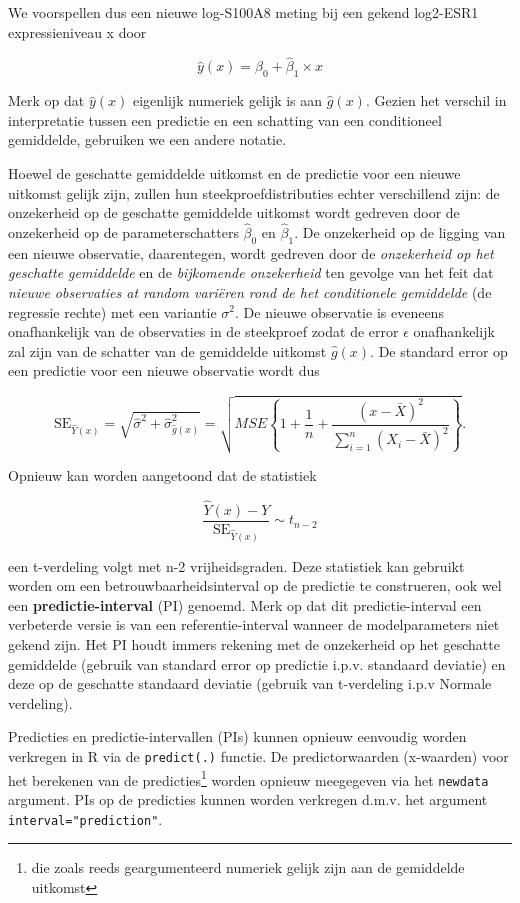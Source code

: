 \documentclass[
  12pt,dutch,coursenotes]{book}
\theoremstyle{definition}
\theoremstyle{definition}
\theoremstyle{definition}
\theoremstyle{remark}
\begin{document}
We voorspellen dus een nieuwe log-S100A8 meting bij een gekend log2-ESR1 expressieniveau x door

\[
  \hat{y}(x)=\hat{\beta}_0+\hat{\beta}_1 \times x
\]

Merk op dat \(\hat{y}(x)\) eigenlijk numeriek gelijk is aan \(\hat{g}(x)\). Gezien het verschil in interpretatie tussen een predictie en een schatting van een conditioneel gemiddelde, gebruiken we een andere notatie.

Hoewel de geschatte gemiddelde uitkomst en de predictie voor een nieuwe uitkomst gelijk zijn, zullen hun steekproefdistributies echter verschillend zijn:
de onzekerheid op de geschatte gemiddelde uitkomst wordt gedreven door de onzekerheid op de parameterschatters \(\hat\beta_0\) en \(\hat\beta_1\). De onzekerheid op de ligging van een nieuwe observatie, daarentegen, wordt gedreven door de \emph{onzekerheid op het geschatte gemiddelde} en de \emph{bijkomende onzekerheid} ten gevolge van het feit dat \emph{nieuwe observaties at random variëren rond de het conditionele gemiddelde} (de regressie rechte) met een variantie \(\sigma^2\). De nieuwe observatie is eveneens onafhankelijk van de observaties in de steekproef zodat de error \(\epsilon\) onafhankelijk zal zijn van de schatter van de gemiddelde uitkomst \(\hat{g}(x)\). De standard error op een predictie voor een nieuwe observatie wordt dus

\[\text{SE}_{\hat{Y}(x)}=\sqrt{\hat\sigma^2+\hat\sigma^2_{\hat{g}(x)}}=\sqrt{MSE\left\{1+\frac{1}{n}+\frac{(x-\bar X)^2}{\sum\limits_{i=1}^n (X_i-\bar X)^2}\right\}}.\]

Opnieuw kan worden aangetoond dat de statistiek

\[\frac{\hat{Y}(x)-Y}{\text{SE}_{\hat{Y}(x)}}\sim t_{n-2}\]

een t-verdeling volgt met n-2 vrijheidsgraden.
Deze statistiek kan gebruikt worden om een betrouwbaarheidsinterval op de predictie te construeren, ook wel een \textbf{predictie-interval} (PI) genoemd.
Merk op dat dit predictie-interval een verbeterde versie is van een referentie-interval wanneer de modelparameters niet gekend zijn. Het PI houdt immers rekening met de onzekerheid op het geschatte gemiddelde (gebruik van standard error op predictie i.p.v. standaard deviatie) en deze op de geschatte standaard deviatie (gebruik van t-verdeling i.p.v Normale verdeling).

Predicties en predictie-intervallen (PIs) kunnen opnieuw eenvoudig worden verkregen in R via de \texttt{predict(.)} functie.
De predictorwaarden (x-waarden) voor het berekenen van de predicties\footnote{die zoals reeds geargumenteerd numeriek gelijk zijn aan de gemiddelde uitkomst} worden opnieuw meegegeven via het \texttt{newdata} argument.
PIs op de predicties kunnen worden verkregen d.m.v. het argument \texttt{interval="prediction"}.
\end{document}
